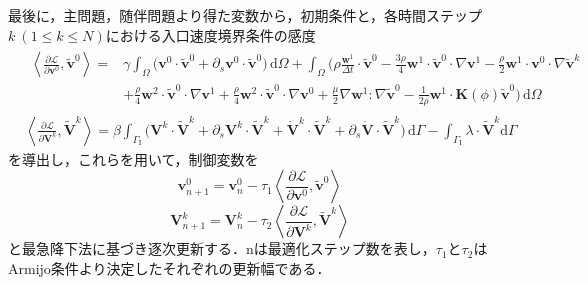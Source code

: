 \documentclass[a4paper,xelatex,ja=standard]{bxjsarticle}
\begin{document}
最後に，主問題，随伴問題より得た変数から，初期条件と，各時間ステップ$k \ (1 \leq k \leq N)$における入口速度境界条件の感度
\begin{align}
    \label{eq:adjoint_v0}
    &\begin{aligned}
        \left\langle\frac{\partial \mathcal{L}}{\partial \mathbf{v}^0}, \tilde{\mathbf{v}}^0\right\rangle
        = &\gamma \int_{\Omega}  \big( \mathbf{v}^{0} \cdot \tilde{\mathbf{v}}^0 
        + \partial_s \mathbf{v}^{0} \cdot \tilde{\mathbf{v}}^0 \big) \, \mathrm{d}\Omega
        + \int_{\Omega} \bigg( \rho\frac{ \mathbf{w}^{1}}{\Delta t} \cdot \tilde{\mathbf{v}}^0
        - \frac{3\rho}{4} \mathbf{w}^{1} \cdot \tilde{\mathbf{v}}^0 \cdot \nabla \mathbf{v}^{1}
        - \frac{\rho}{2} \mathbf{w}^{1} \cdot \mathbf{v}^0 \cdot \nabla \tilde{\mathbf{v}}^{k} \\
        &+ \frac{\rho}{4} \mathbf{w}^{2} \cdot \tilde{\mathbf{v}}^{0} \cdot \nabla \mathbf{v}^1
        + \frac{\rho}{4} \mathbf{w}^{2} \cdot \tilde{\mathbf{v}}^{0} \cdot \nabla \mathbf{v}^{0}
         + \frac{\mu}{2} \nabla \mathbf{w}^{1} : \nabla \tilde{\mathbf{v}}^0
        - \frac{1}{2\rho} \mathbf{w}^{1} \cdot \mathbf{K}(\phi) \tilde{\mathbf{v}}^0 
        \bigg) \, \mathrm{d}\Omega 
    \end{aligned} \\
    &\left\langle\frac{\partial \mathcal{L}}{\partial \mathbf{V}^k}, \widetilde{\mathbf{V}}^k\right\rangle
    = \beta \int_{\Gamma_\mathrm{I}} \big( \mathbf{V}^k \cdot \widetilde{\mathbf{V}}^k + \partial_s \mathbf{V}^k \cdot \widetilde{\mathbf{V}}^k + \dot{\mathbf{V}}^k \cdot \widetilde{\mathbf{V}}^k + \partial_s \dot{\mathbf{V}} \cdot \widetilde{\mathbf{V}}^k \big) \, \mathrm{d}\Gamma
    - \int_{\Gamma_\mathrm{I}} \lambda \cdot \widetilde{\mathbf{V}}^k \mathrm{d} \Gamma
\end{align}
を導出し，これらを用いて，制御変数を
\begin{equation}
    \mathbf{v}^0_{n+1} = \mathbf{v}^0_n - \tau_1\left\langle\frac{\partial \mathcal{L}}{\partial \mathbf{v}^0}, \tilde{\mathbf{v}}^0\right\rangle
\end{equation}
\begin{equation}
    \mathbf{V}^k_{n+1}=\mathbf{V}^k_n - \tau_2\left\langle\frac{\partial \mathcal{L}}{\partial \mathbf{V}^k}, \tilde{\mathbf{V}}^k\right\rangle
\end{equation}
と最急降下法に基づき逐次更新する．nは最適化ステップ数を表し，$\tau_1$と$\tau_2$はArmijo条件より決定したそれぞれの更新幅である．
\newpage
\appendix
\renewcommand{\appendixname}{Appendix }
\end{document}
